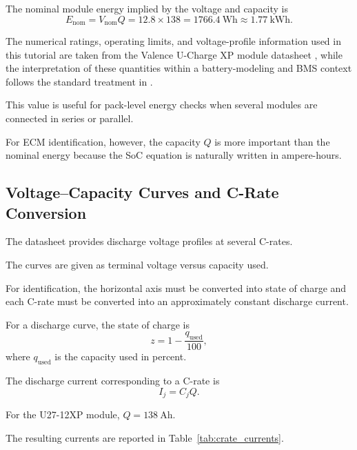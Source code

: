 \documentclass[a4paper,12pt]{article}
\begin{document}
The nominal module energy implied by the voltage and capacity is
\begin{equation}
E_{\mathrm{nom}}
=
V_{\mathrm{nom}}Q
=
12.8\times 138
=
\SI{1766.4}{\watt\hour}
\approx
\SI{1.77}{\kilo\watt\hour}.
\label{eq:valence_nominal_energy}
\end{equation}

The numerical ratings, operating limits, and voltage-profile information used in this tutorial are taken from the Valence U-Charge XP module datasheet \cite{valence_xp_datasheet}, while the interpretation of these quantities within a battery-modeling and BMS context follows the standard treatment in \cite{plett_bms_vol1}.

This value is useful for pack-level energy checks when several modules are connected in series or parallel.

For ECM identification, however, the capacity \(Q\) is more important than the nominal energy because the SoC equation is naturally written in ampere-hours.

\subsection{Voltage--Capacity Curves and C-Rate Conversion}

The datasheet provides discharge voltage profiles at several C-rates.

The curves are given as terminal voltage versus capacity used.

For identification, the horizontal axis must be converted into state of charge and each C-rate must be converted into an approximately constant discharge current.

For a discharge curve, the state of charge is
\begin{equation}
z
=
1
-
\frac{q_{\mathrm{used}}}{100},
\label{eq:data_capacity_to_soc}
\end{equation}
where \(q_{\mathrm{used}}\) is the capacity used in percent.

The discharge current corresponding to a C-rate is
\begin{equation}
I_j
=
C_jQ.
\label{eq:data_crate_to_current}
\end{equation}

For the U27-12XP module, \(Q=\SI{138}{\ampere\hour}\).

The resulting currents are reported in Table~\ref{tab:crate_currents}.
\end{document}
